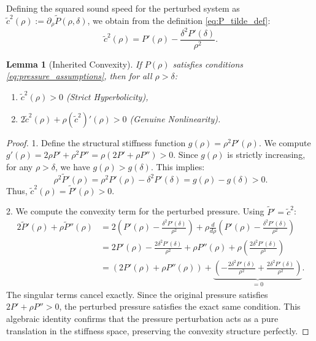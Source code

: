 \documentclass[12pt, reqno]{article}
\newtheorem{lemma}[theorem]{Lemma}
\theoremstyle{definition}
\newcommand{\pa}{\partial}
\numberwithin{equation}{section}
\begin{document}
Defining the squared sound speed for the perturbed system as $\tilde{c}^2(\rho) := \pa_\rho \tilde{P}(\rho,\delta)$, we obtain from the definition \eqref{eq:P_tilde_def}:
\begin{equation} \label{eq:c_tilde}
    \tilde{c}^2(\rho) = P'(\rho) - \frac{\delta^2 P'(\delta)}{\rho^2}.
\end{equation}

\begin{lemma}[Inherited Convexity]
\label{lem:convexity_inherit}
If $P(\rho)$ satisfies conditions \eqref{eq:pressure_assumptions}, then for all $\rho > \delta$:
\begin{enumerate}
    \item $\tilde{c}^2(\rho) > 0$ (Strict Hyperbolicity),
    \item $2\tilde{c}^2(\rho) + \rho (\tilde{c}^2)'(\rho) > 0$ (Genuine Nonlinearity).
\end{enumerate}
\end{lemma}

\begin{proof}
1. Define the structural stiffness function $g(\rho) = \rho^2 P'(\rho)$. We compute $g'(\rho) = 2\rho P' + \rho^2 P'' = \rho(2P' + \rho P'') > 0$. Since $g(\rho)$ is strictly increasing, for any $\rho > \delta$, we have $g(\rho) > g(\delta)$. This implies:
\[
    \rho^2 \tilde{P}'(\rho) = \rho^2 P'(\rho) - \delta^2 P'(\delta) = g(\rho) - g(\delta) > 0.
\]
Thus, $\tilde{c}^2(\rho) = \tilde{P}'(\rho) > 0$.

2. We compute the convexity term for the perturbed pressure. Using $\tilde{P}' = \tilde{c}^2$:
\begin{align*}
    2\tilde{P}'(\rho) + \rho \tilde{P}''(\rho) &= 2\left( P'(\rho) - \frac{\delta^2 P'(\delta)}{\rho^2} \right) + \rho \frac{d}{d\rho} \left( P'(\rho) - \frac{\delta^2 P'(\delta)}{\rho^2} \right) \\
    &= 2P'(\rho) - \frac{2\delta^2 P'(\delta)}{\rho^2} + \rho P''(\rho) + \rho \left( \frac{2\delta^2 P'(\delta)}{\rho^3} \right) \\
    &= (2P'(\rho) + \rho P''(\rho)) + \underbrace{\left( - \frac{2\delta^2 P'(\delta)}{\rho^2} + \frac{2\delta^2 P'(\delta)}{\rho^2} \right)}_{=0}.
\end{align*}
The singular terms cancel exactly. Since the original pressure satisfies $2P'+\rho P'' > 0$, the perturbed pressure satisfies the exact same condition. This algebraic identity confirms that the pressure perturbation acts as a pure translation in the stiffness space, preserving the convexity structure perfectly.
\end{proof}
\end{document}
